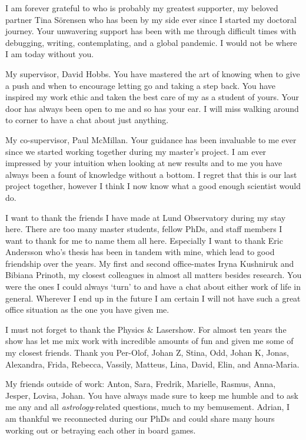 I am forever grateful to who is probably my greatest supporter, my beloved partner Tina Sörensen who has been by my side ever since I started my doctoral journey. Your unwavering support has been with me through difficult times with debugging, writing, contemplating, and a global pandemic. I would not be where I am today without you. 

My supervisor, David Hobbs. You have mastered the art of knowing when to give a push and when to encourage letting go and taking a step back. You have inspired my work ethic and taken the best care of my as a student of yours. Your door has always been open to me and so has your ear. I will miss walking around to corner to have a chat about just anything.

My co-supervisor, Paul McMillan. Your guidance has been invaluable to me ever since we started working together during my master's project. I am ever impressed by your intuition when looking at new results and to me you have always been a fount of knowledge without a bottom. I regret that this is our last project together, however I think I now know what a good enough scientist would do. 

I want to thank the friends I have made at Lund Observatory during my stay here. There are too many master students, fellow PhDs, and staff members I want to thank for me to name them all here. Especially I want to thank Eric Andersson who's thesis has been in tandem with mine, which lead to good friendship over the years. My first and second office-mates Iryna Kushniruk and Bibiana Prinoth, my closest colleagues in almost all matters besides research. You were the ones I could always `turn' to and have a chat about either work of life in general. Wherever I end up in the future I am certain I will not have such a great office situation as the one you have given me. 

I must not forget to thank the Physics \& Lasershow. For almost ten years the show has let me mix work with incredible amounts of fun and given me some of my closest friends. Thank you Per-Olof, Johan Z, Stina, Odd, Johan K, Jonas, Alexandra, Frida, Rebecca, Vassily, Matteus, Lina, David, Elin, and Anna-Maria.  

My friends outside of work: Anton, Sara, Fredrik, Marielle, Rasmus, Anna, Jesper, Lovisa, Johan. You have always made sure to keep me humble and to ask me any and all \textit{astrology}-related questions, much to my bemusement. Adrian, I am thankful we reconnected during our PhDs and could share many hours working out or betraying each other in board games.

